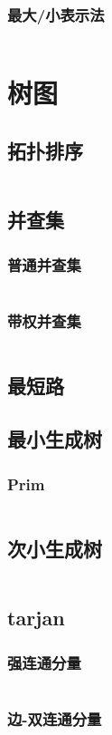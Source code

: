 \documentclass[a4paper,9pt]{article}
\begin{document}
\subsubsection{最大/小表示法}
\inputminted[]{c++}{Template/String/Express.cpp}
\section{树图}
\subsection{拓扑排序}
\inputminted[]{c++}{Template/TreeGraph/TopoSort.cpp}
\subsection{并查集}
\subsubsection{普通并查集}
\inputminted[]{c++}{Template/TreeGraph/UnionSetI.cpp}
\subsubsection{带权并查集}
\inputminted[]{c++}{Template/TreeGraph/UnionSetII.cpp}
\subsection{最短路}
\subsection{最小生成树}
\subsubsection{Prim}
\inputminted[]{c++}{Template/TreeGraph/MST-Prim.cpp}
\subsection{次小生成树}
\inputminted[]{c++}{Template/TreeGraph/SST.cpp}
\subsection{tarjan}
\subsubsection{强连通分量}
\inputminted[]{c++}{Template/TreeGraph/Tarjan-SCC.cpp}
\subsubsection{边-双连通分量}
\inputminted[]{c++}{Template/TreeGraph/Tarjan-Edge-BCC.cpp}
\end{document}
